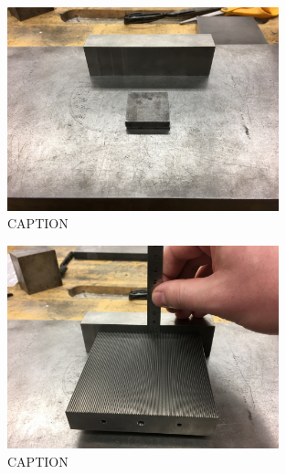 \begin{figure}
	\centering
        \includegraphics[width=0.7\textwidth]{appendix_sample_prep/dds_thickness_blocks.jpg}
   	\caption{CAPTION}
  	\label{Fig:dds_thickness_blocks}
\end{figure}

\begin{figure}
	\centering
        \includegraphics[width=0.7\textwidth]{appendix_sample_prep/dds_thickness_meas.jpg}
   	\caption{CAPTION}
  	\label{Fig:dds_thickness_meas}
\end{figure}


